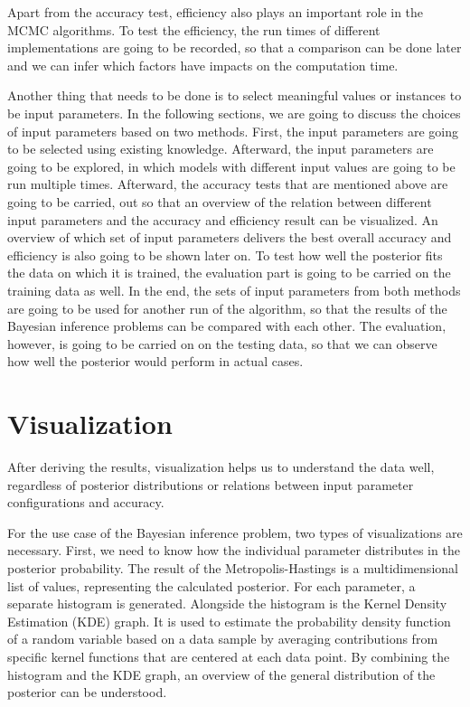 Apart from the accuracy test, efficiency also plays an important role in the MCMC algorithms.\cite{MCMC_efficiency} To test the efficiency, the run times of different implementations are going to be recorded, so that a comparison can be done later and we can infer which factors have impacts on the computation time.

Another thing that needs to be done is to select meaningful values or instances to be input parameters. In the following sections, we are going to discuss the choices of input parameters based on two methods. First, the input parameters are going to be selected using existing knowledge. Afterward, the input parameters are going to be explored, in which models with different input values are going to be run multiple times. Afterward, the accuracy tests that are mentioned above are going to be carried, out so that an overview of the relation between different input parameters and the accuracy and efficiency result can be visualized. An overview of which set of input parameters delivers the best overall accuracy and efficiency is also going to be shown later on. To test how well the posterior fits the data on which it is trained, the evaluation part is going to be carried on the training data as well. In the end, the sets of input parameters from both methods are going to be used for another run of the algorithm, so that the results of the Bayesian inference problems can be compared with each other. The evaluation, however, is going to be carried on on the testing data, so that we can observe how well the posterior would perform in actual cases.

\section{Visualization}
After deriving the results, visualization helps us to understand the data well, regardless of posterior distributions or relations between input parameter configurations and accuracy. 

For the use case of the Bayesian inference problem, two types of visualizations are necessary. First, we need to know how the individual parameter distributes in the posterior probability. The result of the Metropolis-Hastings is a multidimensional list of values, representing the calculated posterior. For each parameter, a separate histogram is generated. Alongside the histogram is the Kernel Density Estimation (KDE) graph. It is used to estimate the probability density function of a random variable based on a data sample by averaging contributions from specific kernel functions that are centered at each data point.\cite{kde} By combining the histogram and the KDE graph, an overview of the general distribution of the posterior can be understood.

